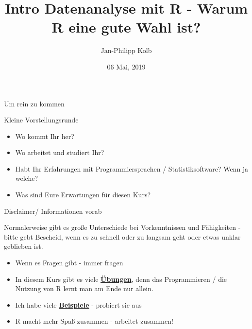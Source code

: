 \documentclass[
  ignorenonframetext,
]{beamer}
\title{Intro Datenanalyse mit R - Warum R eine gute Wahl ist?}
\author{Jan-Philipp Kolb}
\date{06 Mai, 2019}
\providecommand{\tightlist}{%
  \setlength{\itemsep}{0pt}\setlength{\parskip}{0pt}}
\begin{document}
\frame{\titlepage}

\begin{frame}{Um rein zu kommen}
\protect\hypertarget{um-rein-zu-kommen}{}

\begin{block}{Kleine Vorstellungsrunde}

\begin{itemize}
\tightlist
\item
  Wo kommt Ihr her?
\item
  Wo arbeitet und studiert Ihr?
\item
  Habt Ihr Erfahrungen mit Programmiersprachen / Statistiksoftware? Wenn
  ja welche?
\item
  Was sind Eure Erwartungen für diesen Kurs?
\end{itemize}

\end{block}

\end{frame}

\begin{frame}{Disclaimer/ Informationen vorab}
\protect\hypertarget{disclaimer-informationen-vorab}{}

Normalerweise gibt es große Unterschiede bei Vorkenntnissen und
Fähigkeiten - bitte gebt Bescheid, wenn es zu schnell oder zu langsam
geht oder etwas unklar geblieben ist.

\begin{itemize}
\tightlist
\item
  Wenn es Fragen gibt - immer fragen
\item
  In diesem Kurs gibt es viele
  \href{http://web.math.ku.dk/~helle/R-intro/exercises.pdf}{\textbf{Übungen}},
  denn das Programmieren / die Nutzung von R lernt man am Ende nur
  allein.
\item
  Ich habe viele \href{https://www.showmeshiny.com/}{\textbf{Beispiele}}
  - probiert sie aus
\item
  R macht mehr Spaß zusammen - arbeitet zusammen!
\end{itemize}

\end{frame}
\end{document}

